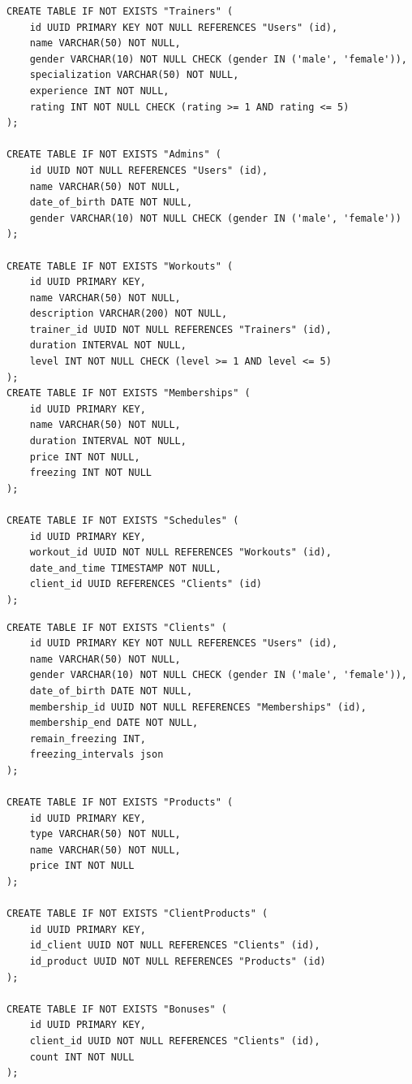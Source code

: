 \begin{center}
	\captionsetup{justification=raggedright,singlelinecheck=off}
	\begin{lstlisting}[label=lst:table2,caption={Код на SQL для создания таблиц Trainers, Admins, Workouts, Memberships, Schedules}]
CREATE TABLE IF NOT EXISTS "Trainers" (
	id UUID PRIMARY KEY NOT NULL REFERENCES "Users" (id),
	name VARCHAR(50) NOT NULL,
	gender VARCHAR(10) NOT NULL CHECK (gender IN ('male', 'female')),
	specialization VARCHAR(50) NOT NULL,
	experience INT NOT NULL,
	rating INT NOT NULL CHECK (rating >= 1 AND rating <= 5)
);

CREATE TABLE IF NOT EXISTS "Admins" (
	id UUID NOT NULL REFERENCES "Users" (id),
	name VARCHAR(50) NOT NULL,
	date_of_birth DATE NOT NULL, 
	gender VARCHAR(10) NOT NULL CHECK (gender IN ('male', 'female'))
);

CREATE TABLE IF NOT EXISTS "Workouts" (
	id UUID PRIMARY KEY,
	name VARCHAR(50) NOT NULL,
	description VARCHAR(200) NOT NULL,
	trainer_id UUID NOT NULL REFERENCES "Trainers" (id),
	duration INTERVAL NOT NULL,
	level INT NOT NULL CHECK (level >= 1 AND level <= 5)
);
CREATE TABLE IF NOT EXISTS "Memberships" (
	id UUID PRIMARY KEY,
	name VARCHAR(50) NOT NULL,
	duration INTERVAL NOT NULL,
	price INT NOT NULL,
	freezing INT NOT NULL
);

CREATE TABLE IF NOT EXISTS "Schedules" (
	id UUID PRIMARY KEY,
	workout_id UUID NOT NULL REFERENCES "Workouts" (id),
	date_and_time TIMESTAMP NOT NULL,
	client_id UUID REFERENCES "Clients" (id)
);
	\end{lstlisting}
\end{center}

\begin{center}
	\captionsetup{justification=raggedright,singlelinecheck=off}
	\begin{lstlisting}[label=lst:table3,caption={Код на SQL для создания таблиц Clients, Products, ClientProducts, Bonuses}]
CREATE TABLE IF NOT EXISTS "Clients" (
	id UUID PRIMARY KEY NOT NULL REFERENCES "Users" (id),
	name VARCHAR(50) NOT NULL,
	gender VARCHAR(10) NOT NULL CHECK (gender IN ('male', 'female')),
	date_of_birth DATE NOT NULL,
	membership_id UUID NOT NULL REFERENCES "Memberships" (id),
	membership_end DATE NOT NULL,
	remain_freezing INT,
	freezing_intervals json
);

CREATE TABLE IF NOT EXISTS "Products" (
	id UUID PRIMARY KEY,
	type VARCHAR(50) NOT NULL,
	name VARCHAR(50) NOT NULL,
	price INT NOT NULL
);

CREATE TABLE IF NOT EXISTS "ClientProducts" (
	id UUID PRIMARY KEY,
	id_client UUID NOT NULL REFERENCES "Clients" (id),
	id_product UUID NOT NULL REFERENCES "Products" (id)
);

CREATE TABLE IF NOT EXISTS "Bonuses" (
	id UUID PRIMARY KEY,
	client_id UUID NOT NULL REFERENCES "Clients" (id),
	count INT NOT NULL
);
	\end{lstlisting}
\end{center}


